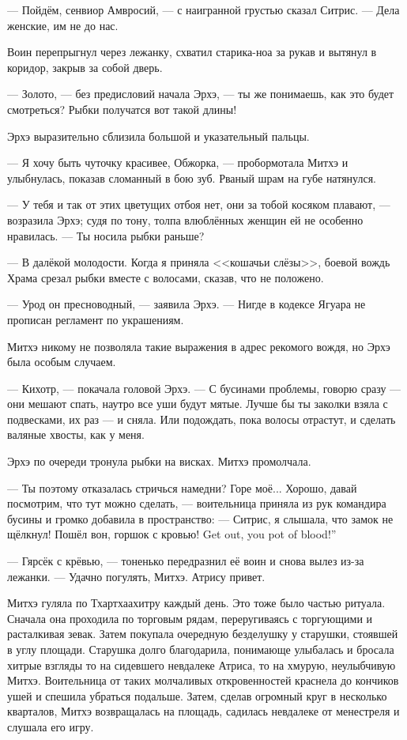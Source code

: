 --- Пойдём, сенвиор Амвросий, --- с наигранной грустью сказал Ситрис.
--- Дела женские, им не до нас.

Воин перепрыгнул через лежанку, схватил старика-ноа за рукав и вытянул в коридор, закрыв за собой дверь.

--- Золото, --- без предисловий начала Эрхэ, --- ты же понимаешь, как это будет смотреться?
Рыбки получатся вот такой длины!

Эрхэ выразительно сблизила большой и указательный пальцы.

--- Я хочу быть чуточку красивее, Обжорка, --- пробормотала Митхэ и улыбнулась, показав сломанный в бою зуб.
Рваный шрам на губе натянулся.

--- У тебя и так от этих цветущих отбоя нет, они за тобой косяком плавают, --- возразила Эрхэ;
судя по тону, толпа влюблённых женщин ей не особенно нравилась.
--- Ты носила рыбки раньше?

--- В далёкой молодости.
Когда я приняла <<кошачьи слёзы>>, боевой вождь Храма срезал рыбки вместе с волосами, сказав, что не положено.

--- Урод он пресноводный, --- заявила Эрхэ.
--- Нигде в кодексе Ягуара не прописан регламент по украшениям.

Митхэ никому не позволяла такие выражения в адрес рекомого вождя, но Эрхэ была особым случаем.

--- Кихотр, --- покачала головой Эрхэ.
--- С бусинами проблемы, говорю сразу --- они мешают спать, наутро все уши будут мятые.
Лучше бы ты заколки взяла с подвесками, их раз --- и сняла.
Или подождать, пока волосы отрастут, и сделать валяные хвосты, как у меня.

Эрхэ по очереди тронула рыбки на висках.
Митхэ промолчала.

--- Ты поэтому отказалась стричься намедни?
Горе моё...
Хорошо, давай посмотрим, что тут можно сделать, --- воительница приняла из рук командира бусины и громко добавила в пространство:
--- Ситрис, я слышала, что замок не щёлкнул!
{Пошёл вон, горшок с кровью!}
{Get out, you pot of blood!''}

--- Гярсёк с крёвью, --- тоненько передразнил её воин и снова вылез из-за лежанки.
--- Удачно погулять, Митхэ.
Атрису привет.

Митхэ гуляла по Тхартхаахитру каждый день.
Это тоже было частью ритуала.
Сначала она проходила по торговым рядам, переругиваясь с торгующими и расталкивая зевак.
Затем покупала очередную безделушку у старушки, стоявшей в углу площади.
Старушка долго благодарила, понимающе улыбалась и бросала хитрые взгляды то на сидевшего невдалеке Атриса, то на хмурую, неулыбчивую Митхэ.
Воительница от таких молчаливых откровенностей краснела до кончиков ушей и спешила убраться подальше.
Затем, сделав огромный круг в несколько кварталов, Митхэ возвращалась на площадь, садилась невдалеке от менестреля и слушала его игру.

